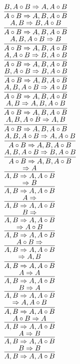 \documentclass[11pt]{article}
\begin{document}
\begin{center}
\bigskip
\\$\infer{A\circ B\Rightarrow A, B, A\circ B}{B, A\circ B\Rightarrow A, A\circ B}$
\bigskip
\\$\infer{A\circ B\Rightarrow A, B, A\circ B}{A, B\Rightarrow B, A\circ B}$
\bigskip
\\$\infer{A\circ B\Rightarrow A, B, A\circ B}{A, B, A\circ B\Rightarrow B}$
\bigskip
\\$\infer{A\circ B\Rightarrow A, B, A\circ B}{A, A\circ B\Rightarrow B, A\circ B}$
\bigskip
\\$\infer{A\circ B\Rightarrow A, B, A\circ B}{B, A\circ B\Rightarrow B, A\circ B}$
\bigskip
\\$\infer{A\circ B\Rightarrow A, B, A\circ B}{A, B, A\circ B\Rightarrow A\circ B}$
\bigskip
\\$\infer{A\circ B\Rightarrow A, B, A\circ B}{A, B\Rightarrow A, B, A\circ B}$
\bigskip
\\$\infer{A\circ B\Rightarrow A, B, A\circ B}{A, B, A\circ B\Rightarrow A, B}$
\bigskip
\\$\infer{A\circ B\Rightarrow A, B, A\circ B}{A, B, A\circ B\Rightarrow A, A\circ B}$
\bigskip
\\$\infer{A\circ B\Rightarrow A, B, A\circ B}{A, B, A\circ B\Rightarrow B, A\circ B}$
\bigskip
\\$\infer{A, B\Rightarrow A, A\circ B}{\Rightarrow A}$
\bigskip
\\$\infer{A, B\Rightarrow A, A\circ B}{\Rightarrow B}$
\bigskip
\\$\infer{A, B\Rightarrow A, A\circ B}{A\Rightarrow }$
\bigskip
\\$\infer{A, B\Rightarrow A, A\circ B}{B\Rightarrow }$
\bigskip
\\$\infer{A, B\Rightarrow A, A\circ B}{\Rightarrow A\circ B}$
\bigskip
\\$\infer{A, B\Rightarrow A, A\circ B}{A\circ B\Rightarrow }$
\bigskip
\\$\infer{A, B\Rightarrow A, A\circ B}{\Rightarrow A, B}$
\bigskip
\\$\infer{A, B\Rightarrow A, A\circ B}{A\Rightarrow A}$
\bigskip
\\$\infer{A, B\Rightarrow A, A\circ B}{B\Rightarrow A}$
\bigskip
\\$\infer{A, B\Rightarrow A, A\circ B}{\Rightarrow A, A\circ B}$
\bigskip
\\$\infer{A, B\Rightarrow A, A\circ B}{A\circ B\Rightarrow A}$
\bigskip
\\$\infer{A, B\Rightarrow A, A\circ B}{A\Rightarrow B}$
\bigskip
\\$\infer{A, B\Rightarrow A, A\circ B}{B\Rightarrow B}$

\end{center}
\end{document}
